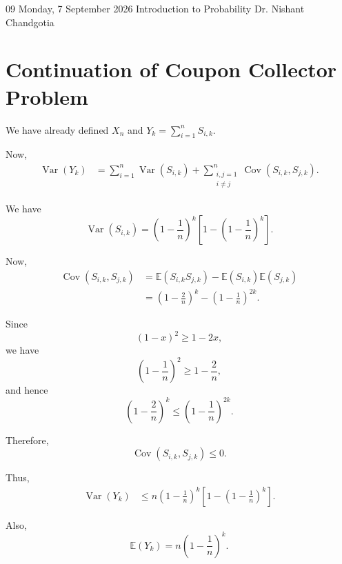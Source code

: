 
\lecture
{09}
{Monday, 7 September 2026}
{Introduction to Probability}
{Dr. Nishant Chandgotia}



\section{Continuation of Coupon Collector Problem}

We have already defined $X_n$ and
\(
    Y_k = \sum_{i=1}^{n} S_{i,k}.
\)

Now,
\[
\begin{aligned}
    \operatorname{Var}(Y_k)
    &=
    \sum_{i=1}^{n}\operatorname{Var}(S_{i,k})
    +
    \sum_{\substack{i,j=1\\i\neq j}}^{n}
    \operatorname{Cov}(S_{i,k},S_{j,k}).
\end{aligned}
\]

We have
\[
    \operatorname{Var}(S_{i,k})
    =
    \left(1-\frac{1}{n}\right)^k
    \left[
        1-\left(1-\frac{1}{n}\right)^k
    \right].
\]

Now,
\[
\begin{aligned}
    \operatorname{Cov}(S_{i,k},S_{j,k})
    &=
    \mathbb{E}(S_{i,k}S_{j,k})
    -
    \mathbb{E}(S_{i,k})\mathbb{E}(S_{j,k}) \\
    &=
    \left(1-\frac{2}{n}\right)^k
    -
    \left(1-\frac{1}{n}\right)^{2k}.
\end{aligned}
\]

Since
\[
    \left(1-x\right)^2
    \geq
    1-2x,
\]
we have
\[
    \left(1-\frac{1}{n}\right)^2
    \geq
    1-\frac{2}{n},
\]
and hence
\[
    \left(1-\frac{2}{n}\right)^k
    \leq
    \left(1-\frac{1}{n}\right)^{2k}.
\]

Therefore,
\[
    \operatorname{Cov}(S_{i,k},S_{j,k})
    \leq 0.
\]

Thus,
\[
\begin{aligned}
    \operatorname{Var}(Y_k)
    &\leq
    n
    \left(1-\frac{1}{n}\right)^k
    \left[
        1-\left(1-\frac{1}{n}\right)^k
    \right].
\end{aligned}
\]

Also,
\[
    \mathbb{E}(Y_k)
    =
    n\left(1-\frac{1}{n}\right)^k.
\]

